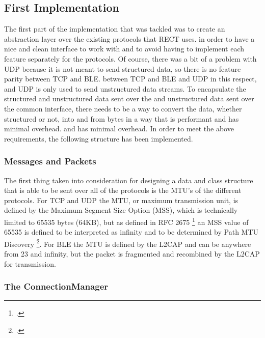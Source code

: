 \subsection{First Implementation}
The first part of the implementation that was tackled was to create an abstraction layer over the existing protocols that RECT uses.
in order to have a nice and clean interface to work with and to avoid having to implement each feature separately for the
protocols. Of course, there was a bit of a problem with UDP because it is not meant to send structured data, so there is no feature parity between TCP and BLE.
between TCP and BLE and UDP in this respect, and UDP is only used to send unstructured data streams. To encapsulate the structured and unstructured data sent over the
and unstructured data sent over the common interface, there needs to be a way to convert the data, whether structured or not, into and from bytes in a way that is performant and has minimal overhead.
and has minimal overhead. In order to meet the above requirements, the following structure has been implemented.
 
\subsubsection{Messages and Packets}
The first thing taken into consideration for designing a data and class structure that is able to be sent over all of the protocols is the MTU's of the different protocols. 
For TCP and UDP the MTU, or maximum transmission unit, is defined by the Maximum Segment Size Option (MSS), which is technically limited to 65535 bytes (64KB), but as defined
in RFC 2675 \footcite{rfc2675} an MSS value of 65535 is defined to be interpreted as infinity and to be determined by Path MTU Discovery \footcite{rfc9293}. For BLE the MTU is 
defined by the L2CAP and can be anywhere from 23 and infinity, but the packet is fragmented and recombined by the L2CAP for transmission. %


\subsubsection{The ConnectionManager}


